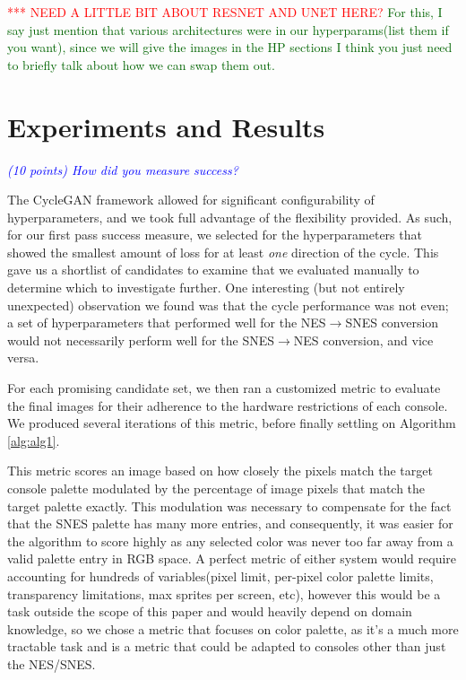 \documentclass[10pt,twocolumn,letterpaper]{article}
\begin{document}
\textcolor{red}{*** NEED A LITTLE BIT ABOUT RESNET AND UNET HERE?}
\textcolor{darkgreen}{For this, I say just mention that various architectures were in our hyperparams(list them if you want), since we will give the images in the HP sections I think you just need to briefly talk about how we can swap them out.}
\section{Experiments and Results}

\textit{\textcolor{blue}{(10 points) How did you measure success?}}

The CycleGAN framework allowed for significant configurability of hyperparameters, and we took full advantage of the flexibility provided. As such, for our first pass success measure, we selected for the hyperparameters that showed the smallest amount of loss for at least \textit{one} direction of the cycle. This gave us a shortlist of candidates to examine that we evaluated manually to determine which to investigate further. One interesting (but not entirely unexpected) observation we found was that the cycle performance was not even; a set of hyperparameters that performed well for the NES$\rightarrow$SNES conversion would not necessarily perform well for the SNES$\rightarrow$NES conversion, and vice versa.

For each promising candidate set, we then ran a customized metric to evaluate the final images for their adherence to the hardware restrictions of each console. We produced several iterations of this metric, before finally settling on Algorithm \ref{alg:alg1}.

This metric scores an image based on how closely the pixels match the target console palette modulated by the percentage of image pixels that match the target palette exactly. This modulation was necessary to compensate for the fact that the SNES palette has many more entries, and consequently, it was easier for the algorithm to score highly as any selected color was never too far away from a valid palette entry in RGB space. A perfect metric of either system would require accounting for hundreds of variables(pixel limit, per-pixel color palette limits, transparency limitations, max sprites per screen, etc), however this would be a task outside the scope of this paper and would heavily depend on domain knowledge, so we chose a metric that focuses on color palette, as it's a much more tractable task and is a metric that could be adapted to consoles other than just the NES/SNES.
\end{document}
